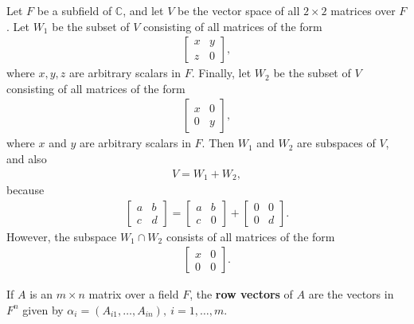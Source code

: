 \documentclass[12pt]{article}
\begin{document}
\begin{exm}
  Let $F$ be a subfield of $\mathbb{C}$, and let $V$ be the vector space of all $2
  \times 2$ matrices over $F$. Let $W_1$ be the subset of $V$ consisting of all
  matrices of the form
  \begin{align*}
    \begin{bmatrix}
      x & y\\
      z & 0
    \end{bmatrix},
  \end{align*}
  where $x,y,z$ are arbitrary scalars in $F$. Finally, let $W_2$ be the subset of $V$
  consisting of all matrices of the form
  \begin{align*}
    \begin{bmatrix}
      x & 0\\
      0 & y
    \end{bmatrix},
  \end{align*}
  where $x$ and $y$ are arbitrary scalars in $F$. Then $W_1$ and $W_2$ are subspaces
  of $V$, and also
  \begin{align*}
    V = W_1 + W_2,
  \end{align*}
  because
  \begin{align*}
    \begin{bmatrix}
      a & b\\
      c & d
    \end{bmatrix}
    =
    \begin{bmatrix}
      a & b\\
      c & 0
    \end{bmatrix}
    +
    \begin{bmatrix}
      0 & 0\\
      0 & d
    \end{bmatrix}.
  \end{align*}
  However, the subspace $W_1 \cap W_2$ consists of all matrices of the form
  \begin{align*}
    \begin{bmatrix}
      x & 0\\
      0 & 0
    \end{bmatrix}.
  \end{align*}
\end{exm}

\begin{defn}
  If $A$ is an $m \times n$ matrix over a field $F$, the \textbf{row vectors} of $A$
  are the vectors in $F^{n}$ given by $\alpha_i = (A_{i1},\ldots,A_{in}),\ i =
  1,\ldots,m$.
\end{defn}
\end{document}
